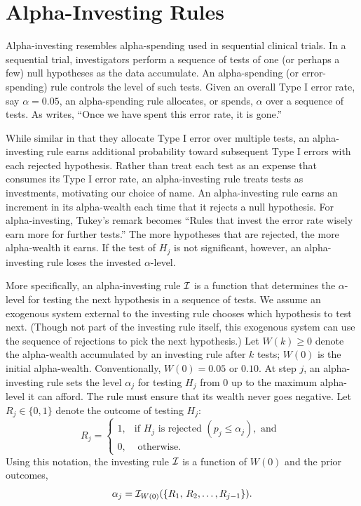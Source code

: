 \documentclass[12pt]{article}
\newcommand{\al}{\alpha}
\begin{document}
\section{Alpha-Investing Rules}   \label{sec:alpha:investing}         %

Alpha-investing resembles alpha-spending
 used in sequential clinical trials.  In a
 sequential trial, investigators perform a sequence
 of tests of one (or perhaps a few) null hypotheses as the data
 accumulate.  An alpha-spending (or error-spending) rule controls the
 level of such tests.  Given an overall Type I error rate, say $\al = 0.05$, 
 an alpha-spending rule allocates, or spends,
 $\alpha$ over a sequence of tests.  As \citet{tukey91} writes, ``Once
 we have spent this error rate, it is gone.''  


While similar in that they allocate Type I error over multiple tests,
 an alpha-investing rule earns additional probability
 toward subsequent Type I errors with each rejected hypothesis.
  Rather than treat each test as an expense that consumes its Type
 I error rate, an alpha-investing rule treats tests as investments,
 motivating our choice of name. An alpha-investing rule earns an increment in its
 alpha-wealth each time that it rejects a null hypothesis.  For alpha-investing, Tukey's remark becomes ``Rules that invest the error rate
 wisely earn more for further tests.''   The more
 hypotheses that are rejected, the more alpha-wealth it earns.  If the
 test of $H_j$ is not significant, however, an alpha-investing rule
 loses the invested  $\alpha$-level.


More specifically, an alpha-investing rule $\cal I$ is a function that
 determines the $\alpha$-level for testing the next hypothesis in a
 sequence of tests.  We assume an exogenous system external to the
 investing rule chooses which hypothesis to test next.  (Though not
 part of the investing rule itself, this exogenous system can use the
 sequence of rejections to pick the next hypothesis.) 
 Let $W(k) \ge 0$ denote the alpha-wealth accumulated by an
 investing rule after $k$ tests; $W(0)$ is the initial alpha-wealth.
 Conventionally, $W(0) = 0.05$ or $0.10$.
  At step $j$, an alpha-investing rule sets the level $\alpha_j$ for
 testing $H_j$ from 0 up to the maximum alpha-level it can afford.  
 The rule must ensure 
 that its wealth never goes negative.   Let $R_j \in \{0,1\}$  denote 
 the outcome of testing $H_{j}$:
\begin{equation}
   R_{j} = \left\{\begin{array}{cl}
       1, & \mbox{if } H_{j} \mbox{ is rejected }(p_{j} \le \alpha_{j}),\mbox{ and } \\
       0, & \mbox{ otherwise.}
       \end{array} \right.
\label{eq:Rj}
\end{equation}
Using this notation, the investing rule $\cal I$ is a function of $W(0)$ and the prior
outcomes,
\begin{equation}
  \alpha_j = {\cal I}_{W(0)}(\{R_1,\, R_2, \ldots,R_{j-1}\}).
\label{eq:invest-rule}
\end{equation}
\end{document}
